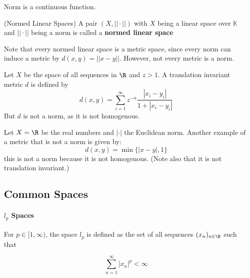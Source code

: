 \begin{remark}
    Norm is a continuous function.
\end{remark}

\begin{defn}
(Normed Linear Spaces) A pair $(X, ||\cdot||)$ with $X$ being a linear space over $\mathbb{K}$ and 
                    $||\cdot||$ being a norm is called a \textbf{normed linear space}
\end{defn} 

Note that every normed linear space is a metric space, since every norm can induce a metric by $d(x,y)=||x-y||$. 
However, not every metric is a norm.  

\begin{eg}
    Let $X$ be the space of all sequences in $\R$ and $z>1$. A translation invariant metric $d$ is defined by  
    \begin{equation*}
        d(x,y) = \sum_{i=1}^{\infty} z^{-n} \dfrac{|x_i-y_i|}{1+|x_i-y_i|}
    \end{equation*}  
    But $d$ is not a norm, as it is not homogenous.
\end{eg}  

\begin{eg}
    Let $X=\R$ be the real numbers and $|\cdot|$ the Euclidean norm. Another example of a metric that is not a norm 
    is given by:
    \begin{equation*}
        d(x,y) = \min \{|x-y|, 1\}
    \end{equation*}  
    this is not a norm because it is not homogenous. (Note also that it is not translation invariant.)
\end{eg}  
\subsection{Common Spaces}  

\paragraph*{$l_p$ Spaces}    
For $p \in [1,\infty)$, the space $l_p$ is defined as the set of all sequences $(x_n)_{n\in \N}$ such that  

\begin{equation*}
    \sum_{n=1}^{\infty} |x_n|^p < \infty
\end{equation*}

